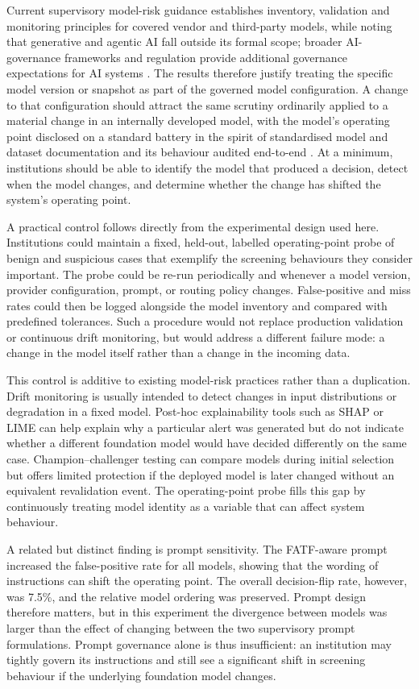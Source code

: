 \documentclass[pdflatex,sn-basic,Numbered]{sn-jnl}
\begin{document}
Current supervisory model-risk guidance establishes inventory, validation and monitoring principles for covered vendor and third-party models, while noting that generative and agentic AI fall outside its formal scope; broader AI-governance frameworks and regulation provide additional governance expectations for AI systems \cite{srguidance,nistrmf,aiact}. The results therefore justify treating the specific model version or snapshot as part of the governed model configuration. A change to that configuration should attract the same scrutiny ordinarily applied to a material change in an internally developed model, with the model's operating point disclosed on a standard battery in the spirit of standardised model and dataset documentation \cite{modelcards,datasheets} and its behaviour audited end-to-end \cite{accountability}. At a minimum, institutions should be able to identify the model that produced a decision, detect when the model changes, and determine whether the change has shifted the system's operating point.

A practical control follows directly from the experimental design used here. Institutions could maintain a fixed, held-out, labelled operating-point probe of benign and suspicious cases that exemplify the screening behaviours they consider important. The probe could be re-run periodically and whenever a model version, provider configuration, prompt, or routing policy changes. False-positive and miss rates could then be logged alongside the model inventory and compared with predefined tolerances. Such a procedure would not replace production validation or continuous drift monitoring, but would address a different failure mode: a change in the model itself rather than a change in the incoming data.

This control is additive to existing model-risk practices rather than a duplication. Drift monitoring is usually intended to detect changes in input distributions or degradation in a fixed model. Post-hoc explainability tools such as SHAP or LIME can help explain why a particular alert was generated but do not indicate whether a different foundation model would have decided differently on the same case. Champion--challenger testing can compare models during initial selection but offers limited protection if the deployed model is later changed without an equivalent revalidation event. The operating-point probe fills this gap by continuously treating model identity as a variable that can affect system behaviour.

A related but distinct finding is prompt sensitivity. The FATF-aware prompt increased the false-positive rate for all models, showing that the wording of instructions can shift the operating point. The overall decision-flip rate, however, was 7.5\%, and the relative model ordering was preserved. Prompt design therefore matters, but in this experiment the divergence between models was larger than the effect of changing between the two supervisory prompt formulations. Prompt governance alone is thus insufficient: an institution may tightly govern its instructions and still see a significant shift in screening behaviour if the underlying foundation model changes.
\end{document}

